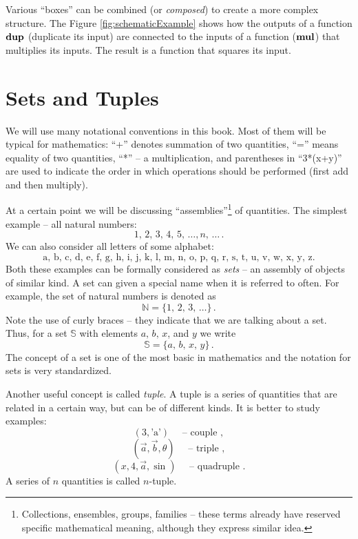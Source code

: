 Various ``boxes'' can be combined (or \emph{composed}) to create a
more complex structure. The Figure \ref{fig:schematicExample} shows
how the outputs of a function $\textrm{\bf dup}$ (duplicate its input) are
connected to the inputs of a function ($\textrm{\bf mul}$) that
multiplies its inputs. The result is a function that squares its input.

\section{Sets and Tuples}\label{sec:SetsTuples}
We will use many notational conventions in this book. Most of them
will be typical for mathematics: ``+'' denotes summation of two
quantities, ``='' means equality of two quantities, ``*'' -- a
multiplication, and parentheses in ``3*(x+y)'' are used to indicate
the order in which operations should be performed (first add and then
multiply).

At a certain point we will be discussing
``assemblies''\footnote{Collections, ensembles, groups, families --
these terms already have reserved specific mathematical meaning,
although they express similar idea.} of quantities. The simplest
example -- all natural numbers:
\[
1,\,2,\,3,\,4,\,5,\,\ldots, n,\,\ldots\,.
\]
We can also consider all letters of some alphabet:
\[
\textrm{a, b, c, d, e, f, g, h, i, j, k, l, m, n, o, p, q, r, s, t, u,
v, w, x, y, z}.
\]
Both these examples can be formally considered as \emph{sets} -- an
assembly of objects of similar kind. A set can given a special name
when it is referred to often. For example, the set of natural numbers
is denoted as
\[
\mathbb{N} = \lbrace 1,\,2,\,3,\,\ldots\rbrace\,.
\]
Note the use of curly braces -- they indicate that we are talking
about a set. Thus, for a set $\mathbb{S}$ with elements $a,\, b,\,
x$, and $y$ we write
\[
\mathbb{S} = \lbrace a,\, b,\, x,\, y\rbrace\,.
\]
The concept of a set is one of the most basic in mathematics and the
notation for sets is very standardized.

Another useful concept is called \emph{tuple}. A tuple is a
series of quantities that are related in a certain way, but can be of
different kinds. It is better to study examples:
\[
(3, \textrm{'a'})\quad\textrm{ -- couple },
\]
\[
(\vec{a}, \vec{b}, \theta)\quad\textrm{ -- triple },
\]
\[
(x, 4, \vec{a}, \sin)\quad\textrm{ -- quadruple }.
\]
A series of $n$ quantities is called $n$-tuple.

